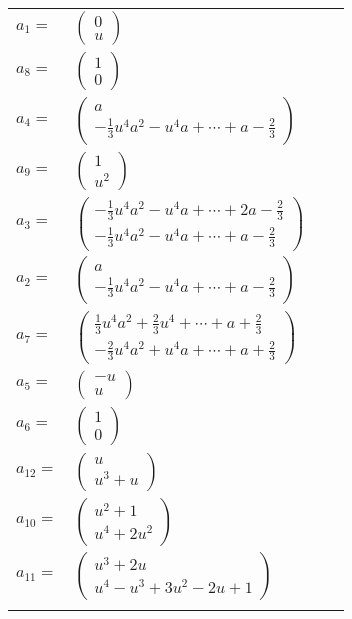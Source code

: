 \documentclass[1p]{elsarticle_modified}
\theoremstyle{definition}
\begin{document}
\begin{tabular}{m{7pt} m{180pt} m{7pt} m{180pt} }
\flushright $a_{1}=$&$\begin{pmatrix}0\\u\end{pmatrix}$ \\
\flushright $a_{8}=$&$\begin{pmatrix}1\\0\end{pmatrix}$ \\
\flushright $a_{4}=$&$\begin{pmatrix}a\\-\frac{1}{3} u^4 a^2- u^4 a+\cdots+a-\frac{2}{3}\end{pmatrix}$ \\
\flushright $a_{9}=$&$\begin{pmatrix}1\\u^2\end{pmatrix}$ \\
\flushright $a_{3}=$&$\begin{pmatrix}-\frac{1}{3} u^4 a^2- u^4 a+\cdots+2 a-\frac{2}{3}\\-\frac{1}{3} u^4 a^2- u^4 a+\cdots+a-\frac{2}{3}\end{pmatrix}$ \\
\flushright $a_{2}=$&$\begin{pmatrix}a\\-\frac{1}{3} u^4 a^2- u^4 a+\cdots+a-\frac{2}{3}\end{pmatrix}$ \\
\flushright $a_{7}=$&$\begin{pmatrix}\frac{1}{3} u^4 a^2+\frac{2}{3} u^4+\cdots+a+\frac{2}{3}\\-\frac{2}{3} u^4 a^2+u^4 a+\cdots+a+\frac{2}{3}\end{pmatrix}$ \\
\flushright $a_{5}=$&$\begin{pmatrix}- u\\u\end{pmatrix}$ \\
\flushright $a_{6}=$&$\begin{pmatrix}1\\0\end{pmatrix}$ \\
\flushright $a_{12}=$&$\begin{pmatrix}u\\u^3+u\end{pmatrix}$ \\
\flushright $a_{10}=$&$\begin{pmatrix}u^2+1\\u^4+2 u^2\end{pmatrix}$ \\
\flushright $a_{11}=$&$\begin{pmatrix}u^3+2 u\\u^4- u^3+3 u^2-2 u+1\end{pmatrix}$\\&\end{tabular}
\end{document}

